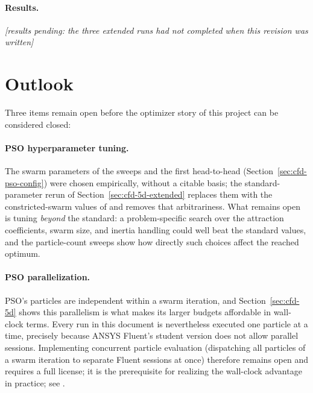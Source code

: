 \paragraph{Results.}
\textit{[results pending: the three extended runs had not completed when
this revision was written]}

\section{Outlook}
\label{sec:outlook}

Three items remain open before the optimizer story of this project can be
considered closed:

\paragraph{PSO hyperparameter tuning.}  The swarm parameters of the
sweeps and the first head-to-head (Section~\ref{sec:cfd-pso-config}) were
chosen empirically, without a citable basis; the standard-parameter rerun
of Section~\ref{sec:cfd-5d-extended} replaces them with the
constricted-swarm values of \cite{clerc2002, bratton2007} and removes
that arbitrariness.  What remains open is tuning \emph{beyond} the
standard: a problem-specific search over the attraction coefficients,
swarm size, and inertia handling could well beat the standard values, and
the particle-count sweeps show how directly such choices affect the
reached optimum.

\paragraph{PSO parallelization.}  PSO's particles are independent within a
swarm iteration, and Section~\ref{sec:cfd-5d} shows this parallelism is
what makes its larger budgets affordable in wall-clock terms.  Every run in
this document is nevertheless executed one particle at a time, precisely
because ANSYS Fluent's student version does not allow parallel sessions.
Implementing concurrent particle evaluation (dispatching all particles of a
swarm iteration to separate Fluent sessions at once) therefore remains open
and requires a full license; it is the prerequisite for realizing the
wall-clock advantage in practice; see \cite{pso_future_work_ref}.


